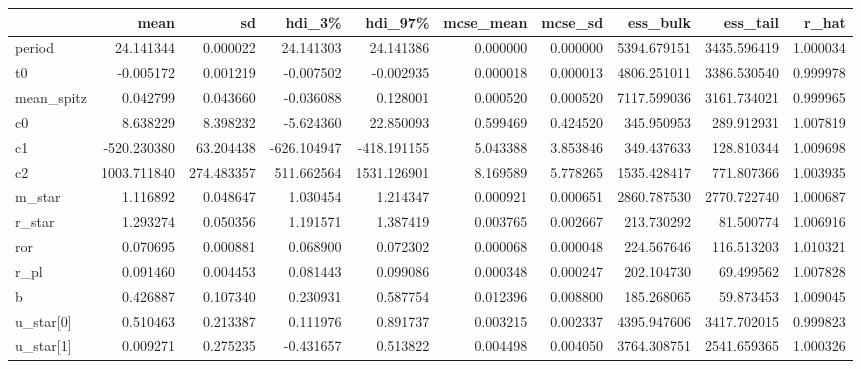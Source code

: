 \begin{tabular}{lrrrrrrrrr}
\toprule
{} &         mean &          sd &      hdi\_3\% &      hdi\_97\% &  mcse\_mean &   mcse\_sd &     ess\_bulk &     ess\_tail &     r\_hat \\
\midrule
period        &    24.141344 &    0.000022 &   24.141303 &    24.141386 &   0.000000 &  0.000000 &  5394.679151 &  3435.596419 &  1.000034 \\
t0            &    -0.005172 &    0.001219 &   -0.007502 &    -0.002935 &   0.000018 &  0.000013 &  4806.251011 &  3386.530540 &  0.999978 \\
mean\_spitz    &     0.042799 &    0.043660 &   -0.036088 &     0.128001 &   0.000520 &  0.000520 &  7117.599036 &  3161.734021 &  0.999965 \\
c0            &     8.638229 &    8.398232 &   -5.624360 &    22.850093 &   0.599469 &  0.424520 &   345.950953 &   289.912931 &  1.007819 \\
c1            &  -520.230380 &   63.204438 & -626.104947 &  -418.191155 &   5.043388 &  3.853846 &   349.437633 &   128.810344 &  1.009698 \\
c2            &  1003.711840 &  274.483357 &  511.662564 &  1531.126901 &   8.169589 &  5.778265 &  1535.428417 &   771.807366 &  1.003935 \\
m\_star        &     1.116892 &    0.048647 &    1.030454 &     1.214347 &   0.000921 &  0.000651 &  2860.787530 &  2770.722740 &  1.000687 \\
r\_star        &     1.293274 &    0.050356 &    1.191571 &     1.387419 &   0.003765 &  0.002667 &   213.730292 &    81.500774 &  1.006916 \\
ror           &     0.070695 &    0.000881 &    0.068900 &     0.072302 &   0.000068 &  0.000048 &   224.567646 &   116.513203 &  1.010321 \\
r\_pl          &     0.091460 &    0.004453 &    0.081443 &     0.099086 &   0.000348 &  0.000247 &   202.104730 &    69.499562 &  1.007828 \\
b             &     0.426887 &    0.107340 &    0.230931 &     0.587754 &   0.012396 &  0.008800 &   185.268065 &    59.873453 &  1.009045 \\
u\_star[0]     &     0.510463 &    0.213387 &    0.111976 &     0.891737 &   0.003215 &  0.002337 &  4395.947606 &  3417.702015 &  0.999823 \\
u\_star[1]     &     0.009271 &    0.275235 &   -0.431657 &     0.513822 &   0.004498 &  0.004050 &  3764.308751 &  2541.659365 &  1.000326 \\

\end{tabular}
